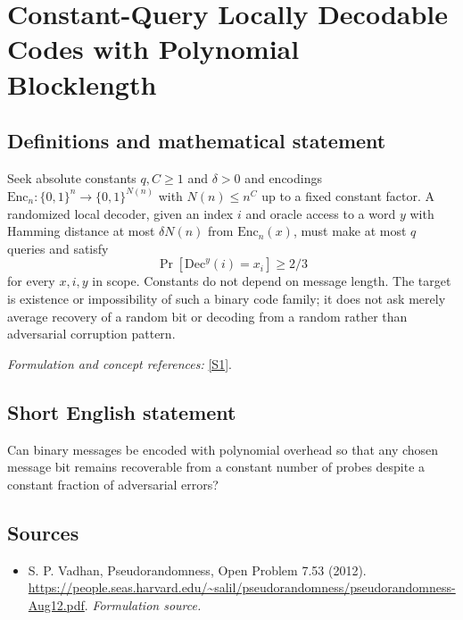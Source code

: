 \documentclass[11pt]{article}
\begin{document}
\section*{\texorpdfstring{Constant-Query Locally Decodable Codes with Polynomial Blocklength}{Constant-Query Locally Decodable Codes with Polynomial Blocklength}}\label{258}
\subsection{Definitions and mathematical statement}
Seek absolute constants $q,C\ge1$ and $\delta>0$ and encodings
$\mathrm{Enc}_n:\{0,1\}^n\to\{0,1\}^{N(n)}$ with $N(n)\le n^C$ up to a fixed constant factor. A randomized local decoder, given an index $i$ and oracle access to a word $y$ with Hamming distance at most $\delta N(n)$ from $\mathrm{Enc}_n(x)$, must make at most $q$ queries and satisfy
\[
 \Pr[\mathrm{Dec}^y(i)=x_i]\ge2/3
\]
for every $x,i,y$ in scope. Constants do not depend on message length. The target is existence or impossibility of such a binary code family; it does not ask merely average recovery of a random bit or decoding from a random rather than adversarial corruption pattern.
\par\smallskip\textit{Formulation and concept references:} \href{https://people.seas.harvard.edu/~salil/pseudorandomness/pseudorandomness-Aug12.pdf}{[S1]}.

\subsection{Short English statement}
Can binary messages be encoded with polynomial overhead so that any chosen message bit remains recoverable from a constant number of probes despite a constant fraction of adversarial errors?
\subsection{Sources}
\begin{itemize}
\item[S1]S. P. Vadhan, Pseudorandomness, Open Problem 7.53 (2012).
\url{https://people.seas.harvard.edu/~salil/pseudorandomness/pseudorandomness-Aug12.pdf}.
\textit{Formulation source.}
\end{itemize}
\end{document}
